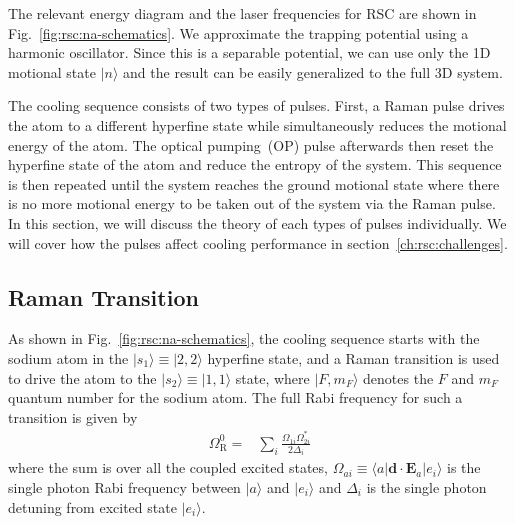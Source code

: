 The relevant energy diagram and the laser frequencies for RSC are shown in
Fig.~\ref{fig:rsc:na-schematics}.
We approximate the trapping potential using a harmonic oscillator.
Since this is a separable potential, we can use only the 1D motional state $|n\rangle$
and the result can be easily generalized to the full 3D system.

The cooling sequence consists of two types of pulses.
First, a Raman pulse drives the atom to a different hyperfine state while simultaneously
reduces the motional energy of the atom.
The optical pumping~(OP) pulse afterwards then reset the hyperfine state of the atom
and reduce the entropy of the system.
This sequence is then repeated until the system reaches the ground motional state
where there is no more motional energy to be taken out of the system via the Raman pulse.
In this section, we will discuss the theory of each types of pulses individually.
We will cover how the pulses affect cooling performance in section~\ref{ch:rsc:challenges}.

\subsection{Raman Transition}
\label{ch:rsc:basic-theory:raman}

As shown in Fig.~\ref{fig:rsc:na-schematics},
the cooling sequence starts with the sodium atom in the
$|s_1\rangle\equiv|2,2\rangle$ hyperfine state,
and a Raman transition is used to drive the atom to the $|s_2\rangle\equiv|1,1\rangle$ state,
where $|F,m_F\rangle$ denotes the $F$ and $m_F$ quantum number for the sodium atom.
The full Rabi frequency for such a transition is given by
\begin{align}
  \Omega_{\mathrm{R}}^0=&\sum_{i}\frac{\Omega_{1i}\Omega_{2i}^*}{2\Delta_i}\label{eq:rsc:basic-theory:raman-rabi}
\end{align}
where the sum is over all the coupled excited states,
$\Omega_{ai}\equiv\langle a|\mathbf{d}\cdot\mathbf{E}_a|e_i\rangle$ is the single photon
Rabi frequency between $|a\rangle$ and $|e_i\rangle$
and $\Delta_i$ is the single photon detuning from excited state $|e_i\rangle$.


